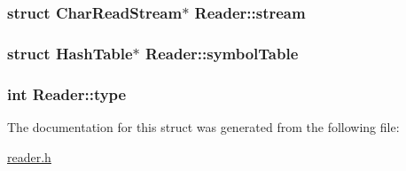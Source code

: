 \hypertarget{structReader_a3f36921203dbd6ab9098f489b42b7d16}{
\subsubsection[{stream}]{\setlength{\rightskip}{0pt plus 5cm}struct {\bf Char\+Read\+Stream}$\ast$ Reader\+::stream}}\label{structReader_a3f36921203dbd6ab9098f489b42b7d16}
\hypertarget{structReader_ac33ce204beac27fe100f45f529a8f526}{
\subsubsection[{symbol\+Table}]{\setlength{\rightskip}{0pt plus 5cm}struct {\bf Hash\+Table}$\ast$ Reader\+::symbol\+Table}}\label{structReader_ac33ce204beac27fe100f45f529a8f526}
\hypertarget{structReader_a6c814c1cc41dd53d9a293ae410d9a30b}{
\subsubsection[{type}]{\setlength{\rightskip}{0pt plus 5cm}int Reader\+::type}}\label{structReader_a6c814c1cc41dd53d9a293ae410d9a30b}


The documentation for this struct was generated from the following file\+:\begin{DoxyCompactItemize}
\item 
\hyperlink{reader_8h}{reader.\+h}\end{DoxyCompactItemize}
